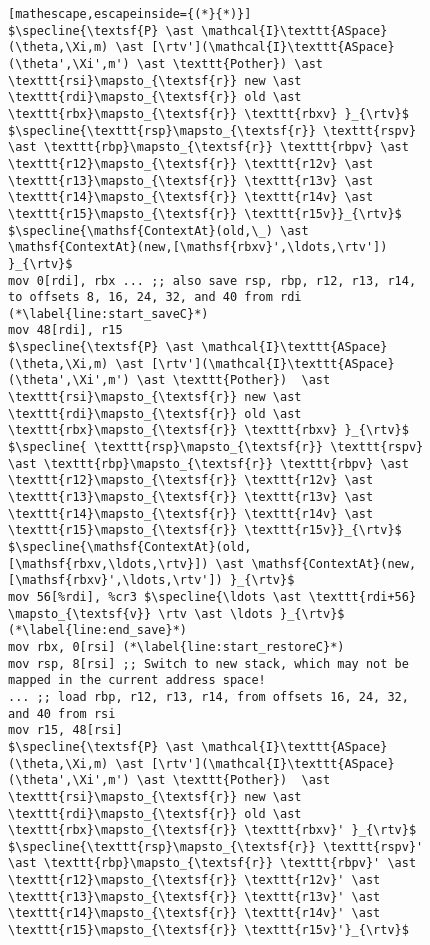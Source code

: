 \begin{figure}\footnotesize
\begin{lstlisting}[mathescape,escapeinside={(*}{*)}]
$\specline{\textsf{P} \ast \mathcal{I}\texttt{ASpace}(\theta,\Xi,m) \ast [\rtv'](\mathcal{I}\texttt{ASpace}(\theta',\Xi',m') \ast \texttt{Pother}) \ast \texttt{rsi}\mapsto_{\textsf{r}} new \ast \texttt{rdi}\mapsto_{\textsf{r}} old \ast \texttt{rbx}\mapsto_{\textsf{r}} \texttt{rbxv} }_{\rtv}$
$\specline{\texttt{rsp}\mapsto_{\textsf{r}} \texttt{rspv} \ast \texttt{rbp}\mapsto_{\textsf{r}} \texttt{rbpv} \ast \texttt{r12}\mapsto_{\textsf{r}} \texttt{r12v} \ast \texttt{r13}\mapsto_{\textsf{r}} \texttt{r13v} \ast \texttt{r14}\mapsto_{\textsf{r}} \texttt{r14v} \ast \texttt{r15}\mapsto_{\textsf{r}} \texttt{r15v}}_{\rtv}$
$\specline{\mathsf{ContextAt}(old,\_) \ast \mathsf{ContextAt}(new,[\mathsf{rbxv}',\ldots,\rtv']) }_{\rtv}$
mov 0[rdi], rbx ... ;; also save rsp, rbp, r12, r13, r14, to offsets 8, 16, 24, 32, and 40 from rdi (*\label{line:start_saveC}*)
mov 48[rdi], r15
$\specline{\textsf{P} \ast \mathcal{I}\texttt{ASpace}(\theta,\Xi,m) \ast [\rtv'](\mathcal{I}\texttt{ASpace}(\theta',\Xi',m') \ast \texttt{Pother})  \ast  \texttt{rsi}\mapsto_{\textsf{r}} new \ast \texttt{rdi}\mapsto_{\textsf{r}} old \ast \texttt{rbx}\mapsto_{\textsf{r}} \texttt{rbxv} }_{\rtv}$
$\specline{ \texttt{rsp}\mapsto_{\textsf{r}} \texttt{rspv} \ast \texttt{rbp}\mapsto_{\textsf{r}} \texttt{rbpv} \ast \texttt{r12}\mapsto_{\textsf{r}} \texttt{r12v} \ast \texttt{r13}\mapsto_{\textsf{r}} \texttt{r13v} \ast \texttt{r14}\mapsto_{\textsf{r}} \texttt{r14v} \ast \texttt{r15}\mapsto_{\textsf{r}} \texttt{r15v}}_{\rtv}$
$\specline{\mathsf{ContextAt}(old,[\mathsf{rbxv,\ldots,\rtv}]) \ast \mathsf{ContextAt}(new,[\mathsf{rbxv}',\ldots,\rtv']) }_{\rtv}$
mov 56[%rdi], %cr3 $\specline{\ldots \ast \texttt{rdi+56} \mapsto_{\textsf{v}} \rtv \ast \ldots }_{\rtv}$   (*\label{line:end_save}*) 
mov rbx, 0[rsi] (*\label{line:start_restoreC}*)
mov rsp, 8[rsi] ;; Switch to new stack, which may not be mapped in the current address space!
... ;; load rbp, r12, r13, r14, from offsets 16, 24, 32, and 40 from rsi
mov r15, 48[rsi]
$\specline{\textsf{P} \ast \mathcal{I}\texttt{ASpace}(\theta,\Xi,m) \ast [\rtv'](\mathcal{I}\texttt{ASpace}(\theta',\Xi',m') \ast \texttt{Pother})  \ast  \texttt{rsi}\mapsto_{\textsf{r}} new \ast \texttt{rdi}\mapsto_{\textsf{r}} old \ast \texttt{rbx}\mapsto_{\textsf{r}} \texttt{rbxv}' }_{\rtv}$
$\specline{\texttt{rsp}\mapsto_{\textsf{r}} \texttt{rspv}' \ast \texttt{rbp}\mapsto_{\textsf{r}} \texttt{rbpv}' \ast \texttt{r12}\mapsto_{\textsf{r}} \texttt{r12v}' \ast \texttt{r13}\mapsto_{\textsf{r}} \texttt{r13v}' \ast \texttt{r14}\mapsto_{\textsf{r}} \texttt{r14v}' \ast \texttt{r15}\mapsto_{\textsf{r}} \texttt{r15v}'}_{\rtv}$

\end{lstlisting}
\end{figure}
